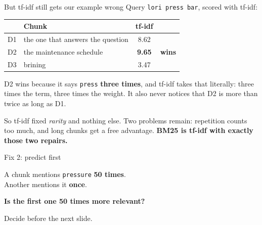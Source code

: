 \documentclass[aspectratio=169]{beamer}
\newcommand{\watchbox}[1]{%
  \begin{tcolorbox}[colback=armorange!12, colframe=armorange, boxrule=0.6pt, arc=2pt]
  #1
  \end{tcolorbox}}
\begin{document}
\begin{frame}{But tf-idf still gets our example wrong}
  \vspace{0.2em}
  Query \texttt{lori press bar}, scored with tf-idf:

  \vspace{0.3em}
  \begin{center}
  \small
  \begin{tabular}{clcc}
    \toprule
    & \textbf{Chunk} & \textbf{tf-idf} & \\
    \midrule
    D1 & the one that answers the question & 8.62 & \\
    D2 & the maintenance schedule          & \textbf{9.65} & \color{armred}\textbf{wins} \\
    D3 & brining                           & 3.47 & \\
    \bottomrule
  \end{tabular}
  \end{center}

  \vspace{0.4em}
  D2 wins because it says \texttt{press} \textbf{three times}, and tf-idf takes that
  literally: three times the term, three times the weight. It also never notices that D2 is
  more than twice as long as D1.

  \vspace{0.4em}
  \watchbox{So tf-idf fixed \emph{rarity} and nothing else. Two problems remain: repetition
  counts too much, and long chunks get a free advantage. \textbf{BM25 is tf-idf with exactly
  those two repairs.}}
\end{frame}

\begin{frame}{Fix 2: predict first}
  \vspace{1.2em}
  \begin{center}
    {\large A chunk mentions \texttt{pressure} \textbf{50 times}.}\\[0.7em]
    {\large Another mentions it \textbf{once}.}
  \end{center}

  \vspace{1.4em}
  \begin{center}
    {\Large\color{popblue}\textbf{Is the first one 50 times more relevant?}}
  \end{center}

  \vspace{1.6em}
  \begin{center}
  {\small\color{gray}Decide before the next slide.}
  \end{center}
\end{frame}
\end{document}
